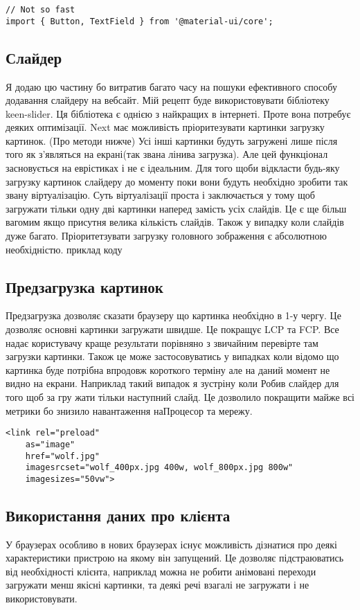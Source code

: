 \begin{lstlisting}
// Not so fast
import { Button, TextField } from '@material-ui/core';
\end{lstlisting}

\subsection{Слайдер}
Я додаю цю частину бо витратив багато часу на пошуки ефективного способу додавання слайдеру на вебсайт.
Мій рецепт буде використовувати бібліотеку keen-slider.
Ця бібліотека є однією з найкращих в інтернеті. Проте вона потребує деяких оптимізації.
Next має можливість пріоритезувати картинки загрузку картинок. (Про методи нижче)
Усі інші картинки будуть загружені лише після того як з'являться на екрані(так звана лінива загрузка).
Але цей функціонал засновується на еврістиках і не є ідеальним.
Для того щоби відкласти будь-яку загрузку картинок слайдеру до моменту поки вони будуть необхідно зробити так звану віртуалізацію.
Суть віртуалізації проста і заключається у тому щоб загружати тільки одну дві картинки наперед замість усіх слайдів.
Це є ще більш вагомим якщо присутня велика кількість слайдів.
Також у випадку коли слайдів дуже багато. Пріоритетзувати загрузку головного зображення є абсолютною необхідністю.
приклад коду

\subsection{Предзагрузка картинок}
Предзагрузка дозволяє сказати браузеру що картинка необхідно в 1-у чергу. Це дозволяє основні картинки загружати швидше.
Це покращує LCP та FCP. Все надає користувачу краще результати порівняно з звичайним перевірте там загрузки картинки.
Також це може застосовуватись у випадках коли відомо що картинка буде потрібна впродовж короткого терміну але на даний момент не видно на екрани.
Наприклад такий випадок я зустріну коли Робив слайдер для того щоб за гру жати тільки наступний слайд. Це дозволило покращити майже всі метрики бо знизило навантаження наПроцесор та мережу.

\begin{lstlisting}
<link rel="preload"
    as="image"
    href="wolf.jpg"
    imagesrcset="wolf_400px.jpg 400w, wolf_800px.jpg 800w"
    imagesizes="50vw">
\end{lstlisting}

\subsection{Використання даних про клієнта}
У браузерах особливо в нових браузерах існує можливість дізнатися про деякі характеристики пристрою на якому він запущений.
Це дозволяє підстраюватись від необхідності клієнта, наприклад можна не робити анімовані переходи загружати менш якісні картинки,
та деякі речі взагалі не загружати і не використовувати.

